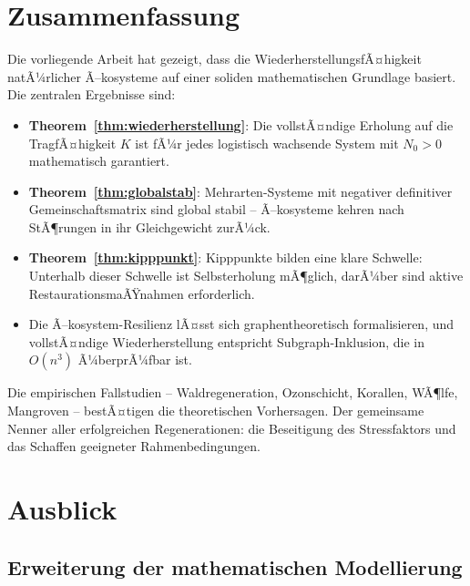 ﻿\documentclass[a4paper,12pt]{article}
\theoremstyle{definition}
\begin{document}
\section{Zusammenfassung}

Die vorliegende Arbeit hat gezeigt, dass die WiederherstellungsfÃ¤higkeit natÃ¼rlicher Ã–kosysteme auf einer soliden mathematischen Grundlage basiert. Die zentralen Ergebnisse sind:

\begin{itemize}
	\item \textbf{Theorem~\ref{thm:wiederherstellung}}: Die vollstÃ¤ndige Erholung auf die TragfÃ¤higkeit $K$ ist fÃ¼r jedes logistisch wachsende System mit $N_0 > 0$ mathematisch garantiert.
	\item \textbf{Theorem~\ref{thm:globalstab}}: Mehrarten-Systeme mit negativer definitiver Gemeinschaftsmatrix sind global stabil -- Ã–kosysteme kehren nach StÃ¶rungen in ihr Gleichgewicht zurÃ¼ck.
	\item \textbf{Theorem~\ref{thm:kipppunkt}}: Kipppunkte bilden eine klare Schwelle: Unterhalb dieser Schwelle ist Selbsterholung mÃ¶glich, darÃ¼ber sind aktive RestaurationsmaÃŸnahmen erforderlich.
	\item Die Ã–kosystem-Resilienz lÃ¤sst sich graphentheoretisch formalisieren, und vollstÃ¤ndige Wiederherstellung entspricht Subgraph-Inklusion, die in $O(n^3)$ Ã¼berprÃ¼fbar ist.
\end{itemize}

Die empirischen Fallstudien -- Waldregeneration, Ozonschicht, Korallen, WÃ¶lfe, Mangroven -- bestÃ¤tigen die theoretischen Vorhersagen. Der gemeinsame Nenner aller erfolgreichen Regenerationen: die Beseitigung des Stressfaktors und das Schaffen geeigneter Rahmenbedingungen.

\section{Ausblick}
\label{sec:ausblick}

\subsection{Erweiterung der mathematischen Modellierung}
\end{document}
